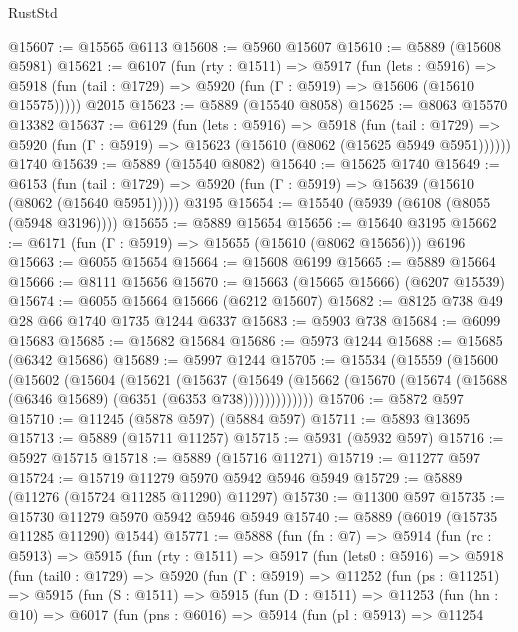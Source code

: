 \begin{lexlean}{RustStd}
\begin{coremodule}
@15607 := @15565 @6113
@15608 := @5960 @15607
@15610 := @5889 (@15608 @5981)
@15621 := @6107
    (fun (rty : @1511) =>
    @5917
      (fun (lets : @5916) =>
      @5918 (fun (tail : @1729) => @5920 (fun (Γ : @5919) => @15606 (@15610 @15575)))))
    @2015
@15623 := @5889 (@15540 @8058)
@15625 := @8063 @15570 @13382
@15637 := @6129
    (fun (lets : @5916) =>
    @5918
      (fun (tail : @1729) =>
      @5920 (fun (Γ : @5919) => @15623 (@15610 (@8062 (@15625 @5949 @5951))))))
    @1740
@15639 := @5889 (@15540 @8082)
@15640 := @15625 @1740
@15649 := @6153
    (fun (tail : @1729) => @5920 (fun (Γ : @5919) => @15639 (@15610 (@8062 (@15640 @5951)))))
    @3195
@15654 := @15540 (@5939 (@6108 (@8055 (@5948 @3196))))
@15655 := @5889 @15654
@15656 := @15640 @3195
@15662 := @6171 (fun (Γ : @5919) => @15655 (@15610 (@8062 @15656))) @6196
@15663 := @6055 @15654
@15664 := @15608 @6199
@15665 := @5889 @15664
@15666 := @8111 @15656
@15670 := @15663 (@15665 @15666) (@6207 @15539)
@15674 := @6055 @15664 @15666 (@6212 @15607)
@15682 := @8125 @738 @49 @28 @66 @1740 @1735 @1244 @6337
@15683 := @5903 @738
@15684 := @6099 @15683
@15685 := @15682 @15684
@15686 := @5973 @1244
@15688 := @15685 (@6342 @15686)
@15689 := @5997 @1244
@15705 := @15534
    (@15559
      (@15600
        (@15602
          (@15604
            (@15621
              (@15637
                (@15649
                  (@15662 (@15670 (@15674 (@15688 (@6346 @15689) (@6351 (@6353 @738)))))))))))))
@15706 := @5872 @597
@15710 := @11245 (@5878 @597) (@5884 @597)
@15711 := @5893 @13695
@15713 := @5889 (@15711 @11257)
@15715 := @5931 (@5932 @597)
@15716 := @5927 @15715
@15718 := @5889 (@15716 @11271)
@15719 := @11277 @597
@15724 := @15719 @11279 @5970 @5942 @5946 @5949
@15729 := @5889 (@11276 (@15724 @11285 @11290) @11297)
@15730 := @11300 @597
@15735 := @15730 @11279 @5970 @5942 @5946 @5949
@15740 := @5889 (@6019 (@15735 @11285 @11290) @1544)
@15771 := @5888
    (fun (fn : @7) =>
    @5914
      (fun (rc : @5913) =>
      @5915
        (fun (rty : @1511) =>
        @5917
          (fun (lets0 : @5916) =>
          @5918
            (fun (tail0 : @1729) =>
            @5920
              (fun (Γ : @5919) =>
              @11252
                (fun (ps : @11251) =>
                @5915
                  (fun (S : @1511) =>
                  @5915
                    (fun (D : @1511) =>
                    @11253
                      (fun (hn : @10) =>
                      @6017
                        (fun (pns : @6016) =>
                        @5914
                          (fun (pl : @5913) =>
                          @11254

\end{coremodule}
\end{lexlean}
